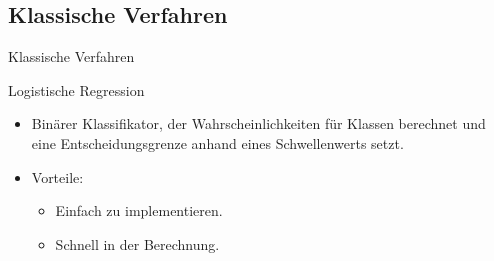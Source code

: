 \documentclass[aspectratio=169]{beamer} %
\begin{document}
\subsection{Klassische Verfahren}

\begin{frame}{Klassische Verfahren}
    \begin{block}{Logistische Regression}
        \begin{itemize}
            \item Binärer Klassifikator, der Wahrscheinlichkeiten für Klassen berechnet und eine Entscheidungsgrenze anhand eines Schwellenwerts setzt.
            \item Vorteile:
                  \begin{itemize}
                      \item Einfach zu implementieren.
                      \item Schnell in der Berechnung.
                  \end{itemize}
        \end{itemize}
    \end{block}
\end{frame}
\end{document}
